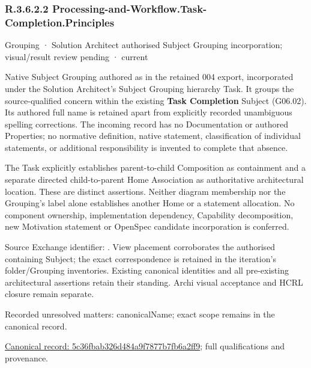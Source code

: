 \subsubsection*{R.3.6.2.2 Processing-and-Workflow.Task-Completion.Principles}
\label{navigation:R.3.6.2.2}

\label{element:5c36fbab326d484a9f7877b7fb6a2ff9}
{\small Grouping · Solution Architect authorised Subject Grouping incorporation; visual/result review pending · current}\par

Native Subject Grouping authored as \texttt{} in the retained 004 export,
incorporated under the Solution Architect's Subject Grouping hierarchy Task.
It groups the source-qualified \texttt{} concern within
the existing \textbf{Task Completion} Subject (G06.02). Its authored full name
is retained apart from explicitly recorded unambiguous spelling corrections.
The incoming record has no Documentation or authored Properties; no normative
definition, native statement, classification of individual statements, or
additional responsibility is invented to complete that absence.



The Task explicitly establishes parent-to-child Composition as containment and
a separate directed child-to-parent Home Association as authoritative architectural
location. These are distinct assertions. Neither diagram membership nor the
Grouping's label alone establishes another Home or a statement allocation.
No component ownership, implementation dependency, Capability decomposition,
new Motivation statement or OpenSpec candidate incorporation is conferred.



Source Exchange identifier: \texttt{}. View placement corroborates
the authorised containing Subject; the exact correspondence is retained in the
iteration's folder/Grouping inventories. Existing canonical identities and all
pre-existing architectural assertions retain their standing. Archi visual
acceptance and HCRL closure remain separate.


{\small Recorded unresolved matters: canonicalName; exact scope remains in the canonical record.}\par
{\footnotesize \href{../../../../continuum/grouping/5c36fbab326d484a9f7877b7fb6a2ff9.md}{Canonical record: 5c36fbab326d484a9f7877b7fb6a2ff9}; full qualifications and provenance.}\par

